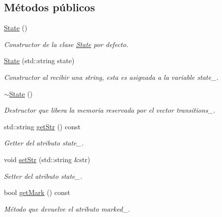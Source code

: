 \subsection*{Métodos públicos}
\begin{DoxyCompactItemize}
\item 
\mbox{\label{classState_ab91bb1dd5aa6260ab2a456581daf9ec2}} 
\hyperlink{classState_ab91bb1dd5aa6260ab2a456581daf9ec2}{State} ()
\begin{DoxyCompactList}\small\item\em Constructor de la clase \hyperlink{classState}{State} por defecto. \end{DoxyCompactList}\item 
\hyperlink{classState_aeb74cd119de80264e758b143d65b19f5}{State} (std\+::string state)
\begin{DoxyCompactList}\small\item\em Constructor al recibir una string, esta es asignada a la variable state\+\_\+. \end{DoxyCompactList}\item 
\mbox{\label{classState_afab438d92b90dc18d194dbd9c9c8bab3}} 
\hyperlink{classState_afab438d92b90dc18d194dbd9c9c8bab3}{$\sim$\+State} ()
\begin{DoxyCompactList}\small\item\em Destructor que libera la memoria reservada por el vector transitions\+\_\+. \end{DoxyCompactList}\item 
std\+::string \hyperlink{classState_acb82f32f51c4d5db3743a3904b22cc75}{get\+Str} () const
\begin{DoxyCompactList}\small\item\em Getter del atributo state\+\_\+. \end{DoxyCompactList}\item 
void \hyperlink{classState_a5b357108140ecc1442dac9a10fa4b43a}{set\+Str} (std\+::string \&str)
\begin{DoxyCompactList}\small\item\em Setter del atributo state\+\_\+. \end{DoxyCompactList}\item 
bool \hyperlink{classState_a47d35b17a579ff3c15989efea2d91398}{get\+Mark} () const
\begin{DoxyCompactList}\small\item\em Método que devuelve el atributo marked\+\_\+. \end{DoxyCompactList}\item 

\end{DoxyCompactItemize}
